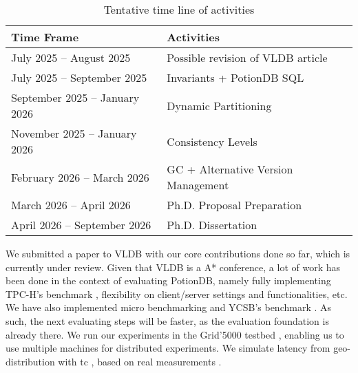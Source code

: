 \setlength{\tabcolsep}{18pt}
\renewcommand{\arraystretch}{1.2}
\begin{table}[h!]
	\centering
	{
	\begin{tabular} {ll}%
		\toprule
		\textbf{Time Frame} & \textbf{Activities} \\
		\midrule
		July 2025 -- August 2025 & Possible revision of VLDB article \\
		July 2025 -- September 2025 & Invariants + PotionDB SQL \\
		September 2025 -- January 2026 & Dynamic Partitioning \\
		November 2025 -- January 2026 & Consistency Levels \\
		February 2026 -- March 2026 & GC + Alternative Version Management \\
		March 2026 -- April 2026 & Ph.D. Proposal Preparation \\
		April 2026 -- September 2026 & Ph.D. Dissertation \\
		\bottomrule
	\end{tabular}}
	\label{table:work_plan}
	\caption{Tentative time line of activities}
	\vspace*{-0.8em}
\end{table}

We submitted a paper to VLDB with our core contributions done so far, which is currently under review.
Given that VLDB is a A* conference, a lot of work has been done in the context of evaluating PotionDB, namely fully implementing TPC-H's benchmark \cite{tpch}, flexibility on client/server settings and functionalities, etc.
We have also implemented micro benchmarking and YCSB's benchmark \cite{ycsb}.
As such, the next evaluating steps will be faster, as the evaluation foundation is already there.
We run our experiments in the Grid'5000 testbed \cite{Grid5000}, enabling us to use multiple machines for distributed experiments.
We simulate latency from geo-distribution with tc \cite{tc}, based on real measurements \cite{AWSLatency}.
%

